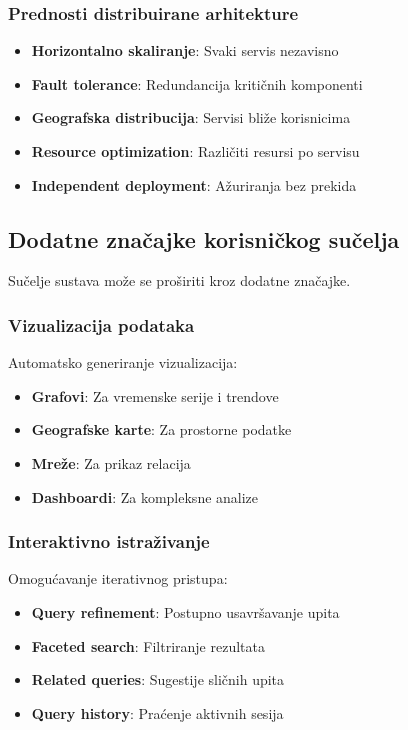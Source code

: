 \subsubsection{Prednosti distribuirane arhitekture}

\begin{itemize}
    \item \textbf{Horizontalno skaliranje}: Svaki servis nezavisno
    \item \textbf{Fault tolerance}: Redundancija kritičnih komponenti
    \item \textbf{Geografska distribucija}: Servisi bliže korisnicima
    \item \textbf{Resource optimization}: Različiti resursi po servisu
    \item \textbf{Independent deployment}: Ažuriranja bez prekida
\end{itemize}

\subsection{Dodatne značajke korisničkog sučelja}

Sučelje sustava može se proširiti kroz dodatne značajke.

\subsubsection{Vizualizacija podataka}

Automatsko generiranje vizualizacija:

\begin{itemize}
    \item \textbf{Grafovi}: Za vremenske serije i trendove
    \item \textbf{Geografske karte}: Za prostorne podatke
    \item \textbf{Mreže}: Za prikaz relacija
    \item \textbf{Dashboardi}: Za kompleksne analize
\end{itemize}

\subsubsection{Interaktivno istraživanje}

Omogućavanje iterativnog pristupa:

\begin{itemize}
    \item \textbf{Query refinement}: Postupno usavršavanje upita
    \item \textbf{Faceted search}: Filtriranje rezultata
    \item \textbf{Related queries}: Sugestije sličnih upita
    \item \textbf{Query history}: Praćenje aktivnih sesija
\end{itemize}

